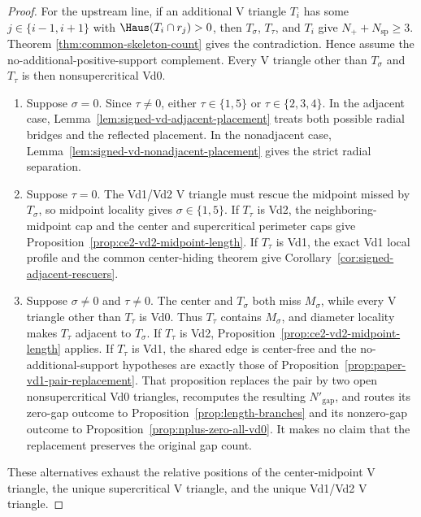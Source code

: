 \begin{proof}
For the upstream line, if an additional V triangle $T_i$ has some
$j\in\{i-1,i+1\}$ with $\Haus(T_i\cap r_j)>0$, then $T_\sigma$,
$T_\tau$, and $T_i$ give $N_++N_{\mathrm{sp}}\ge3$.  Theorem
\ref{thm:common-skeleton-count} gives the contradiction.  Hence assume the
no-additional-positive-support complement.  Every V triangle other than
$T_\sigma$ and $T_\tau$ is then nonsupercritical Vd0.

\begin{enumerate}
\item Suppose $\sigma=0$.  Since $\tau\ne0$, either
$\tau\in\{1,5\}$ or $\tau\in\{2,3,4\}$.  In the adjacent case,
Lemma~\ref{lem:signed-vd-adjacent-placement} treats both possible radial
bridges and the reflected placement.  In the nonadjacent case,
Lemma~\ref{lem:signed-vd-nonadjacent-placement} gives the strict radial
separation.

\item Suppose $\tau=0$.  The Vd1/Vd2 V triangle must rescue the midpoint
missed by $T_\sigma$, so midpoint locality gives
$\sigma\in\{1,5\}$.  If $T_\tau$ is Vd2, the neighboring-midpoint cap and
the center and supercritical perimeter caps give
Proposition~\ref{prop:ce2-vd2-midpoint-length}.  If $T_\tau$ is Vd1, the
exact Vd1 local profile and the common center-hiding theorem give
Corollary~\ref{cor:signed-adjacent-rescuers}.

\item Suppose $\sigma\ne0$ and $\tau\ne0$.  The center and $T_\sigma$
both miss $M_\sigma$, while every V triangle other than $T_\tau$ is Vd0.
Thus $T_\tau$ contains $M_\sigma$, and diameter locality makes $T_\tau$
adjacent to $T_\sigma$.  If $T_\tau$ is Vd2,
Proposition~\ref{prop:ce2-vd2-midpoint-length} applies.  If $T_\tau$ is
Vd1, the shared edge is center-free and the no-additional-support hypotheses
are exactly those of Proposition~\ref{prop:paper-vd1-pair-replacement}.
That proposition replaces the pair by two open nonsupercritical Vd0
triangles, recomputes the resulting $N'_{\mathrm{gap}}$, and routes its
zero-gap outcome to Proposition~\ref{prop:length-branches} and its nonzero-gap
outcome to Proposition~\ref{prop:nplus-zero-all-vd0}.  It makes no claim that
the replacement preserves the original gap count.
\end{enumerate}

These alternatives exhaust the relative positions of the center-midpoint V triangle,
the unique supercritical V triangle, and the unique Vd1/Vd2 V triangle.
\end{proof}
